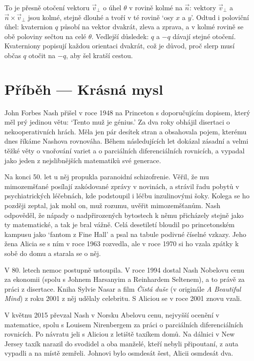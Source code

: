 To je přesně otočení vektoru $\vec{v}_\perp$ o úhel $\theta$ v rovině kolmé na $\vec{n}$: vektory $\vec{v}_\perp$ a $\vec{n}\times\vec{v}_\perp$ jsou kolmé, stejně dlouhé a tvoří v té rovině `osy $x$ a $y$'. Odtud i poloviční úhel: kvaternion $q$ působí na vektor dvakrát, zleva a zprava, a v kolmé rovině se obě poloviny sečtou na celé $\theta$. Vedlejší důsledek: $q$ a $-q$ dávají stejné otočení. Kvaterniony popisují každou orientaci dvakrát, což je důvod, proč slerp musí občas $q$ otočit na $-q$, aby šel kratší cestou.

\section{Příběh --- Krásná mysl}

John Forbes Nash přišel v roce 1948 na Princeton s doporučujícím dopisem, který měl prý jedinou větu: `Tento muž je génius.' Za dva roky obhájil disertaci o nekooperativních hrách. Měla jen pár desítek stran a obsahovala pojem, kterému dnes říkáme Nashova rovnováha. Během následujících let dokázal zásadní a velmi těžké věty o vnořování variet a o parciálních diferenciálních rovnicích, a vypadal jako jeden z nejslibnějších matematiků své generace.

Na konci 50. let u něj propukla paranoidní schizofrenie. Věřil, že mu mimozemšťané posílají zakódované zprávy v novinách, a strávil řadu pobytů v psychiatrických léčebnách, kde podstoupil i léčbu inzulinovými šoky. Kolega se ho později zeptal, jak mohl on, muž rozumu, uvěřit mimozemšťanům. Nash odpověděl, že nápady o nadpřirozených bytostech k němu přicházely stejně jako ty matematické, a tak je bral vážně. Celá desetiletí bloudil po princetonském kampusu jako `fantom z Fine Hall' a psal na tabule podivné číselné vzkazy. Jeho žena Alicia se s ním v roce 1963 rozvedla, ale v roce 1970 si ho vzala zpátky k sobě do domu a starala se o něj.

V 80. letech nemoc postupně ustoupila. V roce 1994 dostal Nash Nobelovu cenu za ekonomii (spolu s Johnem Harsanyim a Reinhardem Seltenem), a to právě za práci z disertace. Kniha Sylvie Nasar a film \textit{Čistá duše} (v originále \textit{A Beautiful Mind}) z roku 2001 z něj udělaly celebritu. S Aliciou se v roce 2001 znovu vzali.

V květnu 2015 převzal Nash v Norsku Abelovu cenu, nejvyšší ocenění v matematice, spolu s Louisem Nirenbergem za práci o parciálních diferenciálních rovnicích. Po návratu jeli s Aliciou z letiště taxíkem domů. Na dálnici v New Jersey taxík narazil do svodidel a oba manželé, kteří nebyli připoutaní, z auta vypadli a na místě zemřeli. Johnovi bylo osmdesát šest, Alicii osmdesát dva.

